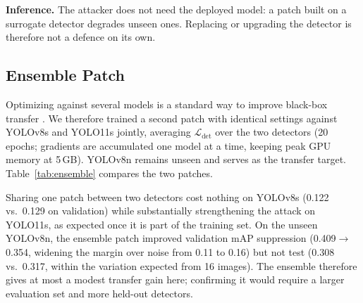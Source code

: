 \documentclass[conference]{IEEEtran}
\begin{document}
\textbf{Inference.} The attacker does not need the deployed model: a patch built on a
surrogate detector degrades unseen ones. Replacing or upgrading the detector is therefore not
a defence on its own.

\subsection{Ensemble Patch}
\label{sec:ensemble}
Optimizing against several models is a standard way to improve black-box transfer
\cite{liu2017delving}. We therefore trained a second patch with identical settings against
YOLOv8s and YOLO11s jointly, averaging $\mathcal{L}_{\text{det}}$ over the two detectors
(20 epochs; gradients are accumulated one model at a time, keeping peak GPU memory at
5\,GB). YOLOv8n remains unseen and serves as the transfer target. Table~\ref{tab:ensemble}
compares the two patches.

\begin{table}[t]
\centering
\caption{Single-model vs.\ ensemble patch (mAP@0.5, val\,/\,test, $\alpha=0.3$).
Noise is the random-noise control on the same detector.}
\label{tab:ensemble}
\setlength{\tabcolsep}{2.5pt}\footnotesize
{}
\end{table}

Sharing one patch between two detectors cost nothing on YOLOv8s (0.122 vs.\ 0.129 on
validation) while substantially strengthening the attack on YOLO11s, as expected once it is
part of the training set. On the unseen YOLOv8n, the ensemble patch improved validation
mAP suppression (0.409$\to$0.354, widening the margin over noise from 0.11 to 0.16) but not
test (0.308 vs.\ 0.317, within the variation expected from 16 images). The ensemble therefore
gives at most a modest transfer gain here; confirming it would require a larger evaluation
set and more held-out detectors.
\end{document}
